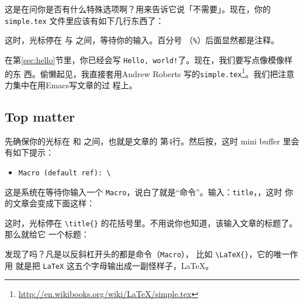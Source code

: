 这是在问你是否有什么特殊选项啊？用来告诉它说「不需要」。现在，你的 \texttt{simple.tex}
文件里应该有如下几行东西了：
\begin{codeblock}[.9]
\end{codeblock}
这时，光标停在 \verb||与 \verb||之间，等待你的输入。百分号
（\verb|%|）后面显然都是注释。

在第\ref{sec:hello}节里，你已经会写 \texttt{Hello, world!}了。现在，我们要写点像模像样的东
西。偷懒起见，我直接套用Andrew Roberts 写的\texttt{simple.tex}\footnote{%
  \url{http://en.wikibooks.org/wiki/LaTeX/simple.tex}}。我们把注意力集中在用Emacs写文章的过
程上。

\subsection{Top matter}

先确保你的光标在 \verb|| 和 \verb|| 之间，也就是文章的
第4行。然后按，这时 mini buffer 里会有如下提示：

\begin{itemize}
\item[] \verb|Macro (default ref): \|
\end{itemize}

这是系统在等待你输入一个 \texttt{Macro}，说白了就是“命令”。输入：\texttt{title}，，这时
你的文章会变成下面这样：

\begin{codeblock}[.9]
\end{codeblock}

这时，光标停在 \verb|\title{}| 的花括号里。不用说你也知道，该输入文章的标题了。那么就给它
一个标题：

\begin{codeblock}[.9]
\end{codeblock}
发现了吗？凡是以反斜杠开头的都是命令（\texttt{Macro}）， 比如 \verb|\LaTeX{}|，它的唯一作用
就是把 \texttt{LaTeX} 这五个字母输出成一副怪样子，\LaTeX{}。

